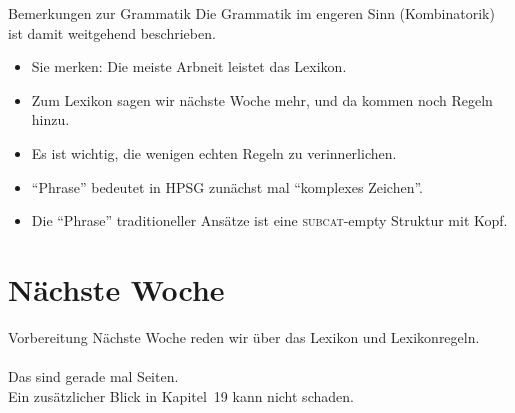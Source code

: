 \begin{frame}
  {Bemerkungen zur Grammatik}
  \onslide<+->
  \onslide<+->
  Die Grammatik im engeren Sinn (Kombinatorik) ist damit weitgehend beschrieben.\\
  \Zeile
  \begin{itemize}[<+->]
    \item Sie merken: Die meiste Arbneit leistet das Lexikon.
    \item Zum Lexikon sagen wir nächste Woche mehr, und da kommen noch Regeln hinzu.
    \item Es ist wichtig, die wenigen echten Regeln zu verinnerlichen.
      \Halbzeile
    \item "`Phrase"' bedeutet in HPSG zunächst mal "`komplexes Zeichen"'.
    \item Die "`Phrase"' traditioneller Ansätze ist eine \textsc{subcat}-empty Struktur mit Kopf.
  \end{itemize}
\end{frame}

\section{Nächste Woche}

\begin{frame}
  {Vorbereitung}
  \onslide<+->
  \onslide<+->
  \centering 
  \large
  Nächste Woche reden wir über das Lexikon und Lexikonregeln.\\
  \onslide<+->
  \Zeile
  \\
  \onslide<+->
  \Viertelzeile
  Das sind gerade mal  Seiten.\\
  Ein zusätzlicher Blick in Kapitel~19 kann nicht schaden.\\
  \onslide<+->
  \Zeile
\end{frame}
